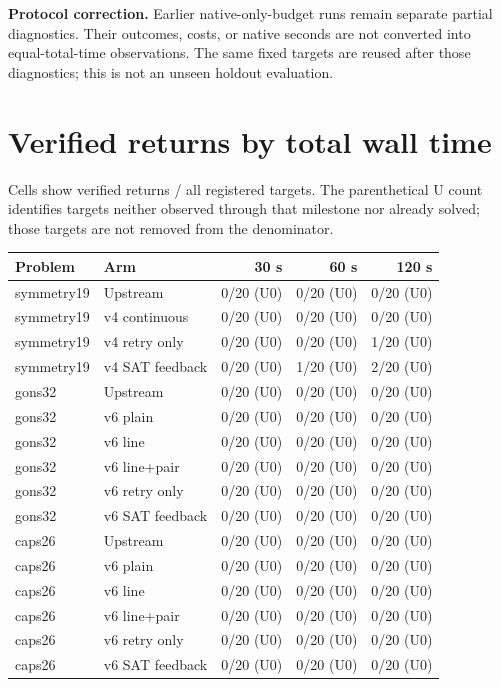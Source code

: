 \documentclass[10pt,a4paper]{article}
\begin{document}
\textbf{Protocol correction.} Earlier native-only-budget runs remain separate partial diagnostics. Their outcomes, costs, or native seconds are not converted into equal-total-time observations. The same fixed targets are reused after those diagnostics; this is not an unseen holdout evaluation.

\section*{Verified returns by total wall time}

Cells show verified returns / all registered targets. The parenthetical U count identifies targets neither observed through that milestone nor already solved; those targets are not removed from the denominator.

\begin{center}\small\begin{longtable}{llrrr}
\toprule
Problem & Arm & 30 s & 60 s & 120 s \\
\midrule\endhead
symmetry19 & Upstream & 0/20 (U0) & 0/20 (U0) & 0/20 (U0) \\
symmetry19 & v4 continuous & 0/20 (U0) & 0/20 (U0) & 0/20 (U0) \\
symmetry19 & v4 retry only & 0/20 (U0) & 0/20 (U0) & 1/20 (U0) \\
symmetry19 & v4 SAT feedback & 0/20 (U0) & 1/20 (U0) & 2/20 (U0) \\
gons32 & Upstream & 0/20 (U0) & 0/20 (U0) & 0/20 (U0) \\
gons32 & v6 plain & 0/20 (U0) & 0/20 (U0) & 0/20 (U0) \\
gons32 & v6 line & 0/20 (U0) & 0/20 (U0) & 0/20 (U0) \\
gons32 & v6 line+pair & 0/20 (U0) & 0/20 (U0) & 0/20 (U0) \\
gons32 & v6 retry only & 0/20 (U0) & 0/20 (U0) & 0/20 (U0) \\
gons32 & v6 SAT feedback & 0/20 (U0) & 0/20 (U0) & 0/20 (U0) \\
caps26 & Upstream & 0/20 (U0) & 0/20 (U0) & 0/20 (U0) \\
caps26 & v6 plain & 0/20 (U0) & 0/20 (U0) & 0/20 (U0) \\
caps26 & v6 line & 0/20 (U0) & 0/20 (U0) & 0/20 (U0) \\
caps26 & v6 line+pair & 0/20 (U0) & 0/20 (U0) & 0/20 (U0) \\
caps26 & v6 retry only & 0/20 (U0) & 0/20 (U0) & 0/20 (U0) \\
caps26 & v6 SAT feedback & 0/20 (U0) & 0/20 (U0) & 0/20 (U0) \\

\end{longtable}
\end{center}
\end{document}
